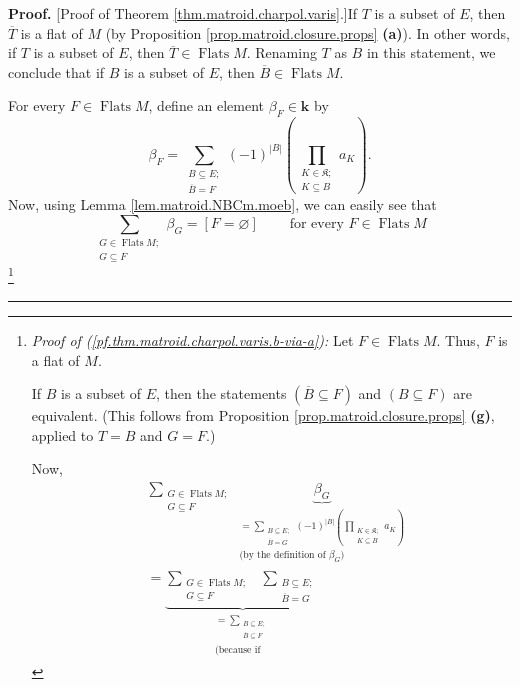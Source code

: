 \documentclass[numbers=enddot,12pt,final,onecolumn,notitlepage]{scrartcl}%
\theoremstyle{definition}
\newenvironment{proof}[1][Proof]{\noindent\textbf{#1.} }{\ \rule{0.5em}{0.5em}}
\let\sumnonlimits\sum
\let\prodnonlimits\prod
\renewcommand{\sum}{\sumnonlimits\limits}
\renewcommand{\prod}{\prodnonlimits\limits}
\begin{document}
\begin{proof}
[Proof of Theorem \ref{thm.matroid.charpol.varis}.]If $T$ is a subset of $E$,
then $\overline{T}$ is a flat of $M$ (by Proposition
\ref{prop.matroid.closure.props} \textbf{(a)}). In other words, if $T$ is a
subset of $E$, then $\overline{T}\in\operatorname*{Flats}M$. Renaming $T$ as
$B$ in this statement, we conclude that if $B$ is a subset of $E$, then
$\overline{B}\in\operatorname*{Flats}M$.

For every $F\in\operatorname*{Flats}M$, define an element $\beta_{F}%
\in\mathbf{k}$ by%
\[
\beta_{F}=\sum_{\substack{B\subseteq E;\\\overline{B}=F}}\left(  -1\right)
^{\left\vert B\right\vert }\left(  \prod_{\substack{K\in\mathfrak{K}%
;\\K\subseteq B}}a_{K}\right)  .
\]
Now, using Lemma \ref{lem.matroid.NBCm.moeb}, we can easily see that%
\begin{equation}
\sum_{\substack{G\in\operatorname*{Flats}M;\\G\subseteq F}}\beta_{G}=\left[
F=\varnothing\right]  \ \ \ \ \ \ \ \ \ \ \text{for every }F\in
\operatorname*{Flats}M \label{pf.thm.matroid.charpol.varis.b-via-a}%
\end{equation}
\footnote{\textit{Proof of (\ref{pf.thm.matroid.charpol.varis.b-via-a}):} Let
$F\in\operatorname*{Flats}M$. Thus, $F$ is a flat of $M$.
\par
If $B$ is a subset of $E$, then the statements $\left(  \overline{B}\subseteq
F\right)  $ and $\left(  B\subseteq F\right)  $ are equivalent. (This follows
from Proposition \ref{prop.matroid.closure.props} \textbf{(g)}, applied to
$T=B$ and $G=F$.)
\par
Now,%
\begin{align*}
&  \sum_{\substack{G\in\operatorname*{Flats}M;\\G\subseteq F}%
}\underbrace{\beta_{G}}_{\substack{=\sum_{\substack{B\subseteq E;\\\overline
{B}=G}}\left(  -1\right)  ^{\left\vert B\right\vert }\left(  \prod
_{\substack{K\in\mathfrak{K};\\K\subseteq B}}a_{K}\right)  \\\text{(by the
definition of }\beta_{G}\text{)}}}\\
&  =\underbrace{\sum_{\substack{G\in\operatorname*{Flats}M;\\G\subseteq
F}}\ \ \sum_{\substack{B\subseteq E;\\\overline{B}=G}}}_{\substack{=\sum
_{\substack{B\subseteq E;\\\overline{B}\subseteq F}}\\\text{(because if
}}}
\end{align*}}
\end{proof}
\end{document}
